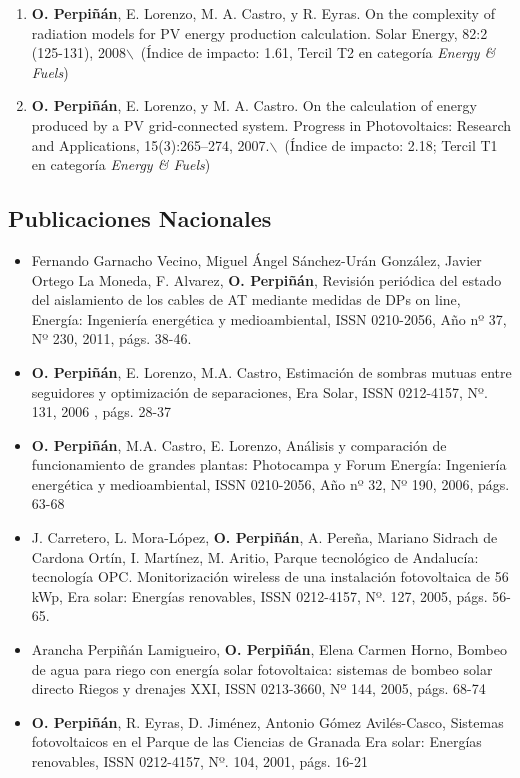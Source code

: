\documentclass[article, a4paper]{memoir}
\begin{document}
\begin{enumerate}
\item \textbf{O. Perpiñán}, E. Lorenzo, M. A. Castro, y R. Eyras. On the complexity of radiation models for PV energy production calculation. Solar Energy, 82:2 (125-131), 2008$\backslash$\ (Índice de impacto: 1.61, Tercil T2 en categoría \emph{Energy \& Fuels})

\item \textbf{O. Perpiñán}, E. Lorenzo, y M. A. Castro. On the calculation of energy produced by a PV grid-connected system. Progress in Photovoltaics: Research and Applications, 15(3):265–274, 2007.$\backslash$\ (Índice de impacto: 2.18; Tercil T1 en categoría \emph{Energy \& Fuels})
\end{enumerate}

\subsection{Publicaciones Nacionales}
\label{sec:orgheadline29}

\begin{itemize}
\item Fernando Garnacho Vecino, Miguel Ángel Sánchez-Urán González, Javier Ortego La Moneda, F. Alvarez, \textbf{O. Perpiñán}, Revisión periódica del estado del aislamiento de los cables de AT mediante medidas de DPs on line, Energía: Ingeniería energética y medioambiental, ISSN 0210-2056, Año nº 37, Nº 230, 2011, págs. 38-46.

\item \textbf{O. Perpiñán}, E. Lorenzo, M.A. Castro, Estimación de sombras mutuas entre seguidores y optimización de separaciones, Era Solar, ISSN 0212-4157, Nº. 131, 2006 , págs. 28-37

\item \textbf{O. Perpiñán}, M.A. Castro, E. Lorenzo, Análisis y comparación de funcionamiento de grandes plantas: Photocampa y Forum Energía: Ingeniería energética y medioambiental, ISSN 0210-2056, Año nº 32, Nº 190, 2006, págs. 63-68

\item J. Carretero, L. Mora-López, \textbf{O. Perpiñán}, A. Pereña, Mariano Sidrach de Cardona Ortín, I. Martínez, M. Aritio, Parque tecnológico de Andalucía: tecnología OPC. Monitorización wireless de una instalación fotovoltaica de 56 kWp, Era solar: Energías renovables, ISSN 0212-4157, Nº. 127, 2005, págs. 56-65.

\item Arancha Perpiñán Lamigueiro, \textbf{O. Perpiñán}, Elena Carmen Horno, Bombeo de agua para riego con energía solar fotovoltaica: sistemas de bombeo solar directo Riegos y drenajes XXI, ISSN 0213-3660, Nº 144, 2005, págs. 68-74

\item \textbf{O. Perpiñán}, R. Eyras, D. Jiménez, Antonio Gómez Avilés-Casco, Sistemas fotovoltaicos en el Parque de las Ciencias de Granada Era solar: Energías renovables, ISSN 0212-4157, Nº. 104, 2001, págs. 16-21
\end{itemize}
\end{document}

